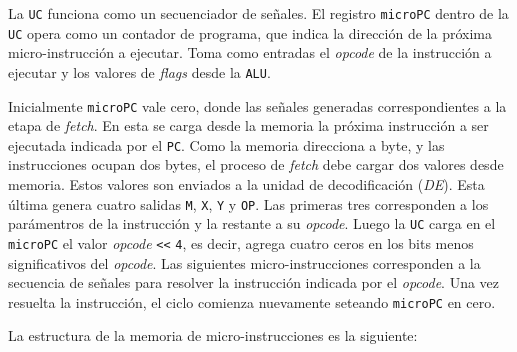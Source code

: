 \documentclass[a4paper,11pt]{article}
\begin{document}
La \texttt{UC} funciona como un secuenciador de señales.
El registro \texttt{microPC} dentro de la \texttt{UC} opera como un contador de programa, que indica la dirección de la próxima micro-instrucción a ejecutar.
Toma como entradas el \emph{opcode} de la instrucción a ejecutar y los valores de \emph{flags} desde la \texttt{ALU}.

Inicialmente \texttt{microPC} vale cero, donde las señales generadas correspondientes a la etapa de \emph{fetch}.
En esta se carga desde la memoria la próxima instrucción a ser ejecutada indicada por el \texttt{PC}.
Como la memoria direcciona a byte, y las instrucciones ocupan dos bytes, el proceso de \emph{fetch} debe cargar dos valores desde memoria.
Estos valores son enviados a la unidad de decodificación (\emph{DE}).
Esta última genera cuatro salidas \texttt{M}, \texttt{X}, \texttt{Y} y \texttt{OP}.
Las primeras tres corresponden a los parámentros de la instrucción y la restante a su \emph{opcode}.
Luego la \texttt{UC} carga en el \texttt{microPC} el valor \emph{opcode} \verb|<<| \texttt{4}, es decir, agrega cuatro ceros en los bits menos significativos del \emph{opcode}.
Las siguientes micro-instrucciones corresponden a la secuencia de señales para resolver la instrucción indicada por el \emph{opcode}.
Una vez resuelta la instrucción, el ciclo comienza nuevamente seteando \texttt{microPC} en cero.

\bigskip

\noindent La estructura de la memoria de micro-instrucciones es la siguiente:
\end{document}
